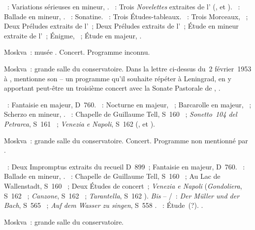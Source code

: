 \begin{description}
 \textsc{\Mendelssohn{}}~: Variations sérieuses en \kD mineur, .
 \textsc{\Schumann{}}~: Trois \emph{Novelettes} extraites de l'
 (,  et ).
 \textsc{\Chopin{}}~: Ballade en \kF mineur, .
 \textsc{\Kabalevski{}}~: Sonatine.
 \textsc{\Rachmaninov{}}~: Trois Études-tableaux.
 \textsc{\Scriabine{}}~: Trois Morceaux, ~; Deux Préludes extraits
 de l'~; Deux Préludes extraits de l'~; Étude en \kB \Flat
 mineur extraite de l'~; Énigme,  ~; Étude en \kD
 \Flat majeur,  .
 \item[\DateWithWeekDay{1953-02-24}]
 Moskva~: musée \Scriabine{}.
 Concert.
 Programme inconnu.
 \item[\DateWithWeekDay{1953-02-25}]
 Moskva~: grande salle du conservatoire.
 Dans la lettre ci-dessus du~2 février~1953 à \AVizel{}, \VSofronitsky{}
 mentionne son  \citep[voir][p.~174]{Nekrasova08} -- un programme
 qu'il souhaite répéter à Leningrad, en y apportant peut-être un troisième
 concert avec la Sonate Pastorale de \Beethoven{}, .

 \textsc{\Schubert{}}~: Fantaisie en \kC majeur, D~760.
 \textsc{\Chopin{}}~: Nocturne en \kG majeur,  ~;
 Barcarolle en \kF \Sharp majeur, ~; Scherzo  en \kB
 \Flat mineur, .
 \textsc{\Liszt{}}~: Chapelle de Guillaume Tell, S~160 ~;
 \emph{Sonetto~104 del Petrarca}, S~161 ~; \emph{Venezia e
 Napoli}, S~162 (,  et ).
 \item[\DateWithWeekDay{1953-03-01}]
 Moskva~: grande salle du conservatoire.
 Concert.
 Programme non mentionné par \citet[p.~435]{Scriabine}.

 \textsc{\Schubert{}}~: Deux Impromptus extraits du recueil D~899~;
 Fantaisie en \kC majeur, D~760.
 \textsc{\Chopin{}}~: Ballade  en \kG mineur, .
 \textsc{\Liszt{}}~: Chapelle de Guillaume Tell, S~160 ~; Au Lac
 de Wallenstadt, S~160 ~; Deux Études de concert~; \emph{Venezia e
 Napoli} (\emph{Gondoliera}, S~162 ~; \emph{Canzone}, S~162
 ~; \emph{Tarantella}, S~162 ).
 \emph{Bis} -- \textsc{\Schubert{}/\Liszt{}}~: \emph{Der Müller und der
 Bach}, S~565 ~; \emph{Auf dem Wasser zu singen}, S~558
 .
 \textsc{\Borodine{}}~: Étude~(?).
 \textsc{\Rachmaninov{}}.
 \item[\DateWithWeekDay{1953-03-19}]
 Moskva~: grande salle du conservatoire.


\end{description}
